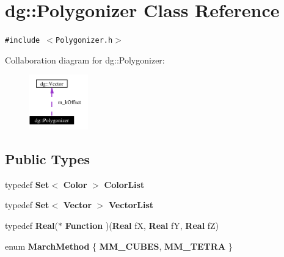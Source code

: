 \section{dg::Polygonizer Class Reference}
\label{classdg_1_1Polygonizer}
{\tt \#include $<$Polygonizer.h$>$}

Collaboration diagram for dg::Polygonizer:\begin{figure}[H]
\begin{center}
\leavevmode
\includegraphics[width=72pt]{classdg_1_1Polygonizer__coll__graph}
\end{center}
\end{figure}
\subsection*{Public Types}
\begin{CompactItemize}
\item 
typedef {\bf Set}$<$ {\bf Color} $>$ {\bf Color\-List}
\item 
typedef {\bf Set}$<$ {\bf Vector} $>$ {\bf Vector\-List}
\item 
typedef {\bf Real}($\ast$ {\bf Function} )({\bf Real} f\-X, {\bf Real} f\-Y, {\bf Real} f\-Z)
\item 
enum {\bf March\-Method} \{ {\bf MM\_\-CUBES}, 
{\bf MM\_\-TETRA}
 \}
\end{CompactItemize}
